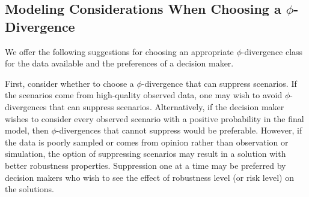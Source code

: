 \documentclass[opre,nonblindrev]{informs3} %
\newcommand{\p}{\mathbf{p}}
\begin{document}

\subsection{Modeling Considerations When Choosing a $\phi$-Divergence}
\label{ssec:modeling}


We offer the following suggestions for choosing an appropriate $\phi$-divergence class for the data available and the preferences of a decision maker.

First, consider whether to choose a  $\phi$-divergence that can suppress scenarios.
If the scenarios come from high-quality observed data, one may wish to avoid $\phi$-divergences that can suppress scenarios.
Alternatively, if the decision maker wishes to consider every observed scenario with a positive probability in the final model, then $\phi$-divergences that cannot suppress would be preferable. 
However, if the data is poorly sampled or comes from opinion rather than observation or simulation, the option of suppressing scenarios may result in a solution with better robustness properties.
Suppression one at a time may be preferred by decision makers who wish to see the effect of robustness level (or risk level) on the solutions.  
\end{document}
